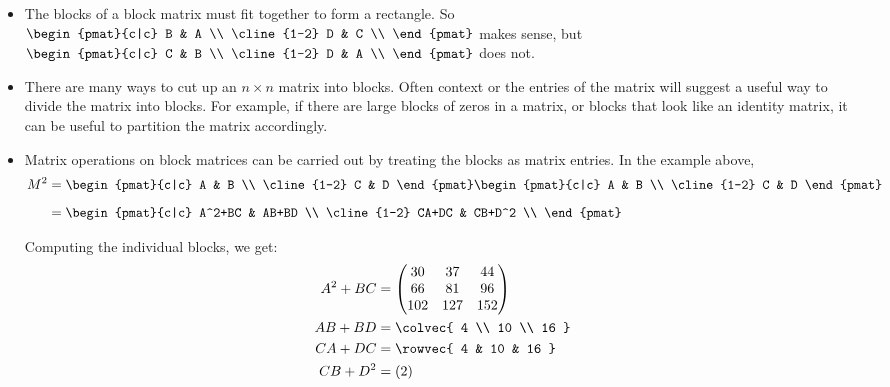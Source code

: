 \begin{itemize}
\item The blocks of a block matrix  must fit together to form a rectangle.  So 
$\begin{pmat}{c|c}
B & A \\
\cline{1-2}
D & C \\
\end{pmat}
$ makes sense, but 
$\begin{pmat}{c|c}
C & B \\
\cline{1-2}
D & A \\
\end{pmat}
$ does not.


\item There are many ways to cut up an $n\times n$ matrix into blocks.  Often context or the entries of the matrix will suggest a useful way to divide the matrix into blocks.  For example, if there are large blocks of zeros in a matrix, or blocks that look like an identity matrix, it can be useful to partition the matrix accordingly.

\item Matrix operations on block matrices can be carried out by treating the blocks as matrix entries.  In the example above,
\begin{align*}
M^2 & = \begin{pmat}{c|c}
A & B \\
\cline{1-2}
C & D 
\end{pmat}
\begin{pmat}{c|c}
A & B \\
\cline{1-2}
C & D 
\end{pmat} \\[2mm]
& = \begin{pmat}{c|c}
A^2+BC & AB+BD \\
\cline{1-2}
CA+DC & CB+D^2 \\
\end{pmat}
\end{align*}

Computing the individual blocks, we get:
\begin{align*}
A^2+BC &=\begin{pmatrix}
	30 & 37 & 44 \\
	66 & 81 & 96 \\
	102&127 &152
	\end{pmatrix} \\
AB+BD  &=\colvec{ 4 \\ 10 \\ 16 } \\
CA+DC  &=\rowvec{ 4 & 10 & 16 } \\
CB+D^2 &=(2) 
\end{align*}


\end{itemize}
